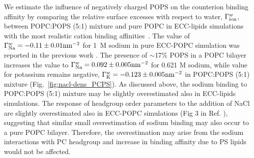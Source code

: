 \documentclass[journal=jpcbfk,manuscript=article]{achemso}
\begin{document}
We estimate the influence of negatively charged POPS on the counterion binding affinity
by comparing the relative surface excesses with respect to water, $\Gamma ^{w} _{\rm ion}$,
between POPC:POPS (5:1) mixture and pure POPC in ECC-lipids simulations with the most realistic
cation binding affinities~\cite{melcr18}.
The value of $\Gamma ^{w} _{\rm Na}=-0.11 \pm 0.01 \mathrm{nm}^{-2}$ for 1~M sodium in pure ECC-POPC
simulation was reported in the previous work \cite{melcr18}.
The presence of $\sim$17\% POPS in a POPC bilayer increases the
value to $\Gamma ^{w} _{\rm Na}=0.092 \pm 0.005 \mathrm{nm}^{-2}$ 
for 0.621 M sodium, while value for potassium remains negative,
$\Gamma ^{w} _{\rm K}=-0.123 \pm 0.005 \mathrm{nm}^{-2}$ in POPC:POPS (5:1) mixture (Fig.~\ref{fig:nacl-dens_PCPS}).
As discussed above, the sodium binding to POPC:POPS (5:1) mixture may be slightly overestimated also in
ECC-lipids simulations. The response of headgroup order parameters to the addition of NaCl are
slightly overestimated also in ECC-POPC simulations (Fig 3 in Ref. ),
suggesting that similar small overestimation of sodium binding may also occur to a pure POPC bilayer.
Therefore, the overestimation may arise from the sodium interactions with PC headgroup and
increase in binding affinity due to PS lipids would not be affected.
\end{document}
